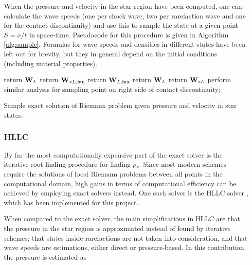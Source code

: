 \documentclass[final,3p,twocolumn,times]{elsarticle}
\begin{document}
When the pressure and velocity in the star region have been computed, one can
calculate the wave speeds (one per shock wave, two per rarefaction wave and one
for the contact discontinuity) and use this to sample the state at a given
point $S = x/t$ in space-time. Pseudocode for this procedure is given in
Algorithm \ref{alg:sample}. Formulas for wave speeds and densities in different
states have been left out for brevity, but they in general depend on the
initial conditions (including material properties).

\begin{algorithm}[htb]
    {
        {
            {
                return ${\bf W}_L$\;
            }
            {
                {
                    return ${\bf W}_{*L, {\rm fan}}$\;
                }
                {
                    return ${\bf W}_{L, {\rm fan}}$\;
                }
            }
        }
        {
            {
                return ${\bf W}_L$\;
            }
            {
                return ${\bf W}_{*L}$\;
            }
        }
    }
    {
        perform similar analysis for sampling point on right side of contact
        discontinuity; 
    }
    \caption{Sample exact solution of Riemann problem given pressure and
    velocity in star states.}
    \label{alg:sample}
\end{algorithm}

\subsubsection{HLLC}
\label{subsubsec:hllc}

By far the most computationally expensive part of the exact solver is the
iterative root finding procedure for finding $p_*$. Since most modern schemes
require the solutions of local Riemann problems between all points in the
computational domain, high gains in terms of computational efficiency can be
achieved by employing exact solvers instead. One such solver is the HLLC solver
\cite{toro1994restoration}, which has been implemented for this project. 

When compared to the exact solver, the main simplifications in HLLC are that
the pressure in the star region is approximated instead of found by iterative
schemes; that states inside rarefactions are not taken into consideration, and 
that wave speeds are estimations, either direct or pressure-based. In this
contribution, the pressure is estimated as 
\end{document}
